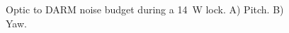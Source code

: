 \begin{figure}
\begin{centering}
\caption[Optic to DARM noise budget]{Optic to DARM noise budget during a
  14~W lock. A) Pitch. B) Yaw.}%
\label{fig:optic2DARM}
\end{centering}
\end{figure}


